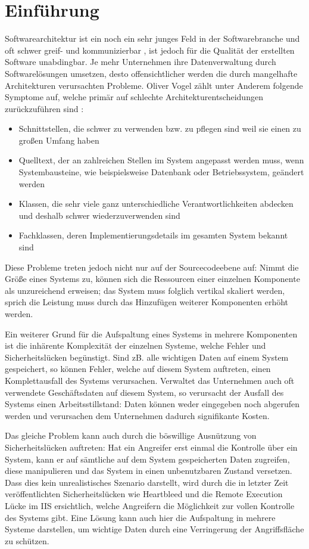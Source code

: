 \chapter{Einführung}
Softwarearchitektur ist ein noch ein sehr junges Feld in der Softwarebranche und oft schwer greif- und kommunizierbar \cite[S. 8]{softarch}, ist jedoch für die Qualität der erstellten Software unabdingbar. Je mehr Unternehmen ihre Datenverwaltung durch Softwarelösungen umsetzen, desto offensichtlicher werden die durch mangelhafte Architekturen verursachten Probleme. Oliver Vogel zählt unter Anderem folgende Symptome auf, welche primär auf schlechte Architekturentscheidungen zurückzuführen sind \cite[S. 7]{softarch}:

\begin{itemize}
  \item \glqq Schnittstellen, die schwer zu verwenden bzw. zu pflegen sind weil sie einen zu großen Umfang haben\grqq
  \item \glqq Quelltext, der an zahlreichen Stellen im System angepasst werden muss, wenn Systembausteine, wie beispielsweise Datenbank oder Betriebssystem, geändert werden\grqq
  \item \glqq Klassen, die sehr viele ganz unterschiedliche Verantwortlichkeiten abdecken und deshalb schwer wiederzuverwenden sind\grqq
  \item \glqq Fachklassen, deren Implementierungsdetails im gesamten System bekannt sind\grqq
\end{itemize}

Diese Probleme treten jedoch nicht nur auf der Sourcecodeebene auf: Nimmt die Größe eines Systems zu, können sich die Ressourcen einer einzelnen Komponente als unzureichend erweisen; das System muss folglich vertikal skaliert werden, sprich die Leistung muss durch das Hinzufügen weiterer Komponenten erhöht werden.

Ein weiterer Grund für die Aufspaltung eines Systems in mehrere Komponenten ist die inhärente Komplexität der einzelnen Systeme, welche Fehler und Sicherheitslücken begünstigt. Sind zB. alle wichtigen Daten auf einem System gespeichert, so können Fehler, welche auf diesem System auftreten, einen Komplettausfall des Systems verursachen. Verwaltet das Unternehmen auch oft verwendete Geschäftsdaten auf diesem System, so verursacht der Ausfall des Systems einen Arbeitsstillstand: Daten können weder eingegeben noch abgerufen werden und verursachen dem Unternehmen dadurch signifikante Kosten.

Das gleiche Problem kann auch durch die böswillige Ausnützung von Sicherheitslücken auftreten: Hat ein Angreifer erst einmal die Kontrolle über ein System, kann er auf sämtliche auf dem System gespeicherten Daten zugreifen, diese manipulieren und das System in einen unbenutzbaren Zustand versetzen. Dass dies kein unrealistisches Szenario darstellt, wird durch die in letzter Zeit veröffentlichten Sicherheitslücken wie Heartbleed\cite{heartbleed} und die Remote Execution Lücke im IIS ersichtlich\cite{iis}, welche Angreifern die Möglichkeit zur vollen Kontrolle des Systems gibt. Eine Lösung kann auch hier die Aufspaltung in mehrere Systeme darstellen, um wichtige Daten durch eine Verringerung der Angriffsfläche zu schützen.

